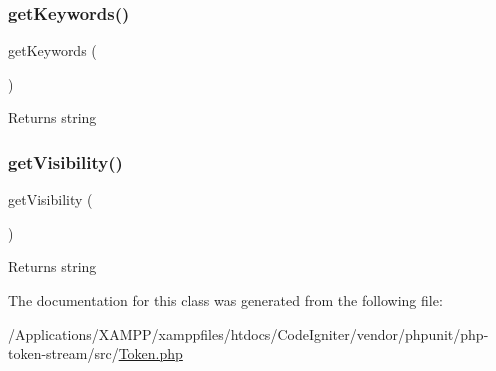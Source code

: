 \subsubsection{\texorpdfstring{get\+Keywords()}{getKeywords()}}
{\footnotesize\ttfamily get\+Keywords (\begin{DoxyParamCaption}{ }\end{DoxyParamCaption})}

\begin{DoxyReturn}{Returns}
string 
\end{DoxyReturn}
\mbox{\label{class_p_h_p___token_with_scope_and_visibility_a292b98b1e11ce740774e4d99a8276904}} 
\subsubsection{\texorpdfstring{get\+Visibility()}{getVisibility()}}
{\footnotesize\ttfamily get\+Visibility (\begin{DoxyParamCaption}{ }\end{DoxyParamCaption})}

\begin{DoxyReturn}{Returns}
string 
\end{DoxyReturn}


The documentation for this class was generated from the following file\+:\begin{DoxyCompactItemize}
\item 
/\+Applications/\+X\+A\+M\+P\+P/xamppfiles/htdocs/\+Code\+Igniter/vendor/phpunit/php-\/token-\/stream/src/\mbox{\hyperlink{_token_8php}{Token.\+php}}\end{DoxyCompactItemize}
